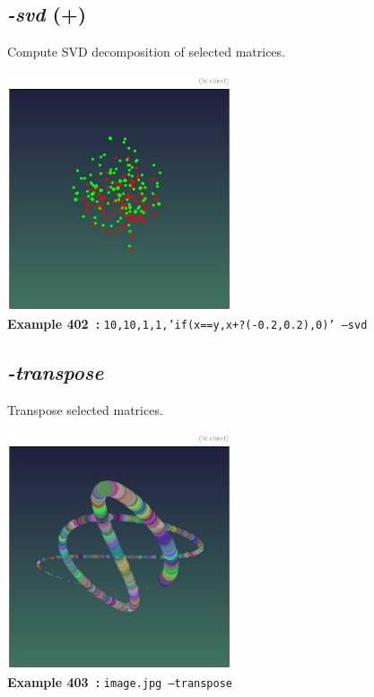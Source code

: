\documentclass[a4paper,11pt,twoside]{book}
\begin{document}
\subsection{\emph{-svd} (+)}\vspace*{-0.5em}
Compute SVD decomposition of selected matrices.
\begin{center}\includegraphics[keepaspectratio=true,height=7cm,width=\textwidth]{img/gmic_def402.jpg}\\
{\footnotesize \textbf{Example 402~:} \texttt{10,10,1,1,'if(x==y,x+?(-0.2,0.2),0)' --svd}}
\end{center}

\subsection{\emph{-transpose} }\vspace*{-0.5em}
Transpose selected matrices.
\begin{center}\includegraphics[keepaspectratio=true,height=7cm,width=\textwidth]{img/gmic_def403.jpg}\\
{\footnotesize \textbf{Example 403~:} \texttt{image.jpg --transpose}}
\end{center}
\end{document}
